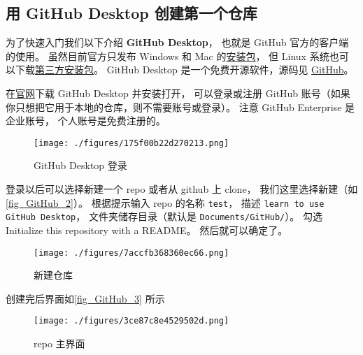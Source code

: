 
\subsection{用 GitHub Desktop 创建第一个仓库}
为了快速入门我们以下介绍 \textbf{GitHub Desktop}， 也就是 GitHub 官方的客户端的使用。 虽然目前官方只发布 Windows 和 Mac 的\href{https://desktop.github.com/}{安装包}， 但 Linux 系统也可以下载\href{https://github.com/shiftkey/desktop/releases}{第三方安装包}。 GitHub Desktop 是一个免费开源软件，源码见 \href{https://github.com/desktop/desktop}{GitHub}。

在\href{https://desktop.github.com/}{官网}下载 GitHub Desktop 并安装打开， 可以登录或注册 GitHub 账号（如果你只想把它用于本地的仓库，则不需要账号或登录）。 注意 GitHub Enterprise 是企业账号， 个人账号是免费注册的。 %

\begin{figure}[ht]
\centering
\texttt{[image: ./figures/175f00b22d270213.png]}
\caption{GitHub Desktop 登录} \label{fig_GitHub_1}
\end{figure}

登录以后可以选择新建一个 repo 或者从 github 上 clone， 我们这里选择新建（如\autoref{fig_GitHub_2}）。 根据提示输入 repo 的名称 \verb|test|， 描述 \verb|learn to use GitHub Desktop|， 文件夹储存目录（默认是 \verb|Documents/GitHub/|）。 勾选 Initialize this repository with a README。 然后就可以确定了。

\begin{figure}[ht]
\centering
\texttt{[image: ./figures/7accfb368360ec66.png]}
\caption{新建仓库} \label{fig_GitHub_2}
\end{figure}

创建完后界面如\autoref{fig_GitHub_3} 所示
\begin{figure}[ht]
\centering
\texttt{[image: ./figures/3ce87c8e4529502d.png]}
\caption{repo 主界面} \label{fig_GitHub_3}
\end{figure}

